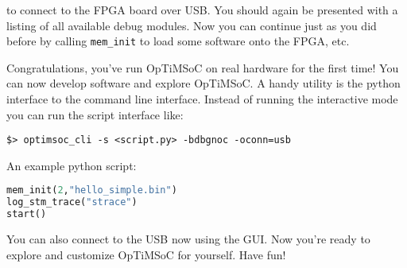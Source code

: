 to connect to the FPGA board over USB. You should again be presented with a
listing of all available debug modules. Now you can continue just as you did
before by calling \verb|mem_init| to load some software onto the FPGA, etc.

Congratulations, you've run OpTiMSoC on real hardware for the first
time! You can now develop software and explore OpTiMSoC. A handy
utility is the python interface to the command line interface. Instead
of running the interactive mode you can run the script interface like:

\begin{lstlisting}
$> optimsoc_cli -s <script.py> -bdbgnoc -oconn=usb
\end{lstlisting}

An example python script:

\begin{lstlisting}[language=python]
mem_init(2,"hello_simple.bin")
log_stm_trace("strace")
start()
\end{lstlisting}

You can also connect to the USB now using the GUI. Now you're ready to
explore and customize OpTiMSoC for yourself. Have fun!
